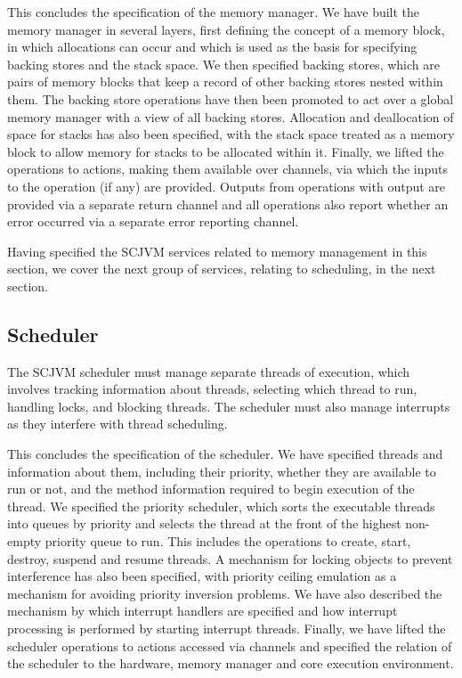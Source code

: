

This concludes the specification of the memory manager.
We have built the memory manager in several layers, first defining the
concept of a memory block, in which allocations can occur and which is
used as the basis for specifying backing stores and the stack space.
We then specified backing stores, which are pairs of memory blocks
that keep a record of other backing stores nested within them.
The backing store operations have then been promoted to act over a
global memory manager with a view of all backing stores.
Allocation and deallocation of space for stacks has also been
specified, with the stack space treated as a memory block to allow
memory for stacks to be allocated within it.
Finally, we lifted the operations to \Circus{} actions, making them
available over channels, via which the inputs to the operation (if
any) are provided.
Outputs from operations with output are provided via a separate return
channel and all operations also report whether an error occurred via a
separate error reporting channel.

Having specified the SCJVM services related to memory management in
this section, we cover the next group of services, relating to
scheduling, in the next section.

\subsection{Scheduler}
\label{scheduler-model-section}

The SCJVM scheduler must manage separate threads of execution, which
involves tracking information about threads, selecting which thread to
run, handling locks, and blocking threads.
The scheduler must also manage interrupts as they interfere with
thread scheduling.



This concludes the specification of the scheduler.
We have specified threads and information about them, including their
priority, whether they are available to run or not, and the method
information required to begin execution of the thread.
We specified the priority scheduler, which sorts the executable
threads into queues by priority and selects the thread at the front of
the highest non-empty priority queue to run.
This includes the operations to create, start, destroy, suspend and
resume threads.
A mechanism for locking objects to prevent interference has also been
specified, with priority ceiling emulation as a mechanism for avoiding
priority inversion problems.
We have also described the mechanism by which interrupt handlers are
specified and how interrupt processing is performed by starting
interrupt threads.
Finally, we have lifted the scheduler operations to \Circus{} actions
accessed via channels and specified the relation of the scheduler to
the hardware, memory manager and core execution environment.

